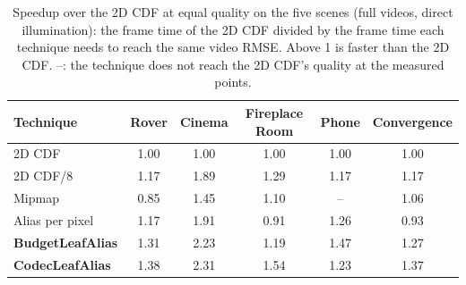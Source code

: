 \begin{table}[H]
\centering\small
\caption{Speedup over the 2D CDF at equal quality on the five scenes (full videos, direct illumination): the frame time of the 2D CDF divided by the frame time each technique needs to reach the same video RMSE. Above 1 is faster than the 2D CDF. --: the technique does not reach the 2D CDF's quality at the measured points.}
\label{tab:scenes}
\begin{tabular}{lccccc}
\toprule
Technique & Rover & Cinema & Fireplace Room & Phone & Convergence \\
\midrule
2D CDF & 1.00 & 1.00 & 1.00 & 1.00 & 1.00 \\
2D CDF/8 & 1.17 & 1.89 & 1.29 & 1.17 & 1.17 \\
Mipmap & 0.85 & 1.45 & 1.10 & -- & 1.06 \\
Alias per pixel & 1.17 & 1.91 & 0.91 & 1.26 & 0.93 \\
\textbf{BudgetLeafAlias} & 1.31 & 2.23 & 1.19 & 1.47 & 1.27 \\
\textbf{CodecLeafAlias} & 1.38 & 2.31 & 1.54 & 1.23 & 1.37 \\
\bottomrule
\end{tabular}
\end{table}
